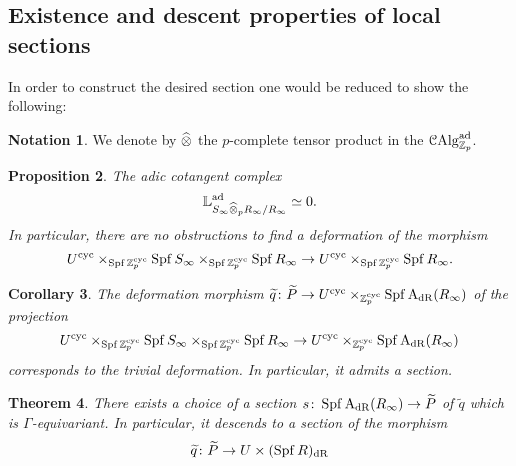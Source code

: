 \documentclass[10pt,a4paper]{amsart}
\numberwithin{equation}{subsection}
\newtheorem{theorem}{Theorem}[subsection]
\newtheorem{corollary}[theorem]{Corollary}
\newtheorem{proposition}[theorem]{Proposition}
\theoremstyle{definition}
\newtheorem{notation}[theorem]{Notation}
\begin{document}
\subsection{Existence and descent properties of local sections} In order to construct the desired section one would be reduced to show the following:

\begin{notation}
    We denote by $\widehat{\otimes}$ the $p$-complete tensor product in the \infcat $\mathcal C \mathrm{Alg}^{\mathrm{ad}}_{\mathbb Z_p}$.
\end{notation} 

\begin{proposition}
    The \emph{adic cotangent complex} 
        \[
                \mathbb{L}^{\mathrm{ad}}_{S_\infty \widehat{\otimes}_p R_\infty / R_\infty} \simeq 0.  
        \]
    In particular, there are no obstructions to find a deformation of the morphism
        \[
                U^{\mathrm{cyc}} \times_{\operatorname{Spf} \mathbb Z_p^{\mathrm{cyc}}} \operatorname{Spf} S_\infty \times_{\operatorname{Spf} \mathbb Z_p^{\mathrm{cyc}}} \operatorname{Spf} R_\infty \to U^{\mathrm{cyc}} \times_{\operatorname{Spf} \mathbb Z_p^{\mathrm{cyc}}} \operatorname{Spf} R_\infty.  
        \]
\end{proposition}

\begin{corollary}
    The deformation morphism $\widetilde{q} \colon \widetilde{P} \to U^{\mathrm{cyc}} \times_{\mathbb Z_p^{\mathrm{cyc}}} \operatorname{Spf} \mathrm{A}_{\mathrm{dR}}(R_\infty)$ of the projection
        \[
                U^{\mathrm{cyc}} \times_{\operatorname{Spf} \mathbb Z_p^{\mathrm{cyc}}} \operatorname{Spf} S_\infty \times_{\operatorname{Spf} \mathbb Z_p^{\mathrm{cyc}}} \operatorname{Spf} R_\infty \to U^{\mathrm{cyc}} \times_{\mathbb Z_p^{\mathrm{cyc}}} \operatorname{Spf} \mathrm{A}_{\mathrm{dR}}(R_\infty)  
        \]
    corresponds to the trivial deformation. In particular, it admits a section.
\end{corollary}

\begin{theorem}
    There exists a choice of a section $s \colon \operatorname{Spf} \mathrm{A}_{\mathrm{dR}}(R_\infty) \to \widetilde{P}$ of $\widetilde{q}$ which is $\Gamma$-equivariant. In particular, it descends to a section of the morphism
        \[
            \widetilde{q} \colon \widetilde{P} \to U \times (\operatorname{Spf} R)_{\mathrm{dR}}  
        \]
\end{theorem}





\end{document}
